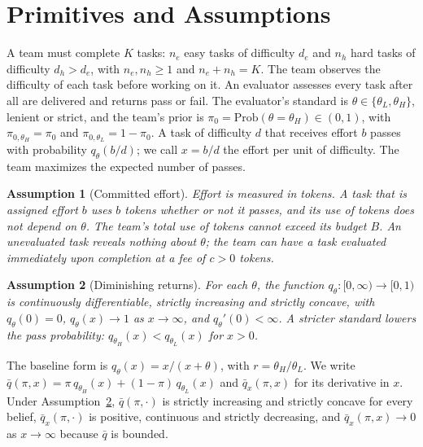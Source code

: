 \documentclass[11pt]{article}
\newtheorem{assumption}{Assumption}
\theoremstyle{definition}
\begin{document}
\section{Primitives and Assumptions}

A team must complete $K$ tasks: $n_e$ easy tasks of difficulty $d_e$ and $n_h$ hard tasks of difficulty $d_h>d_e$, with $n_e,n_h\ge1$ and $n_e+n_h=K$. The team observes the difficulty of each task before working on it. An evaluator assesses every task after all are delivered and returns pass or fail. The evaluator's standard is $\theta\in\{\theta_L,\theta_H\}$, lenient or strict, and the team's prior is $\pi_0=\mathrm{Prob}(\theta=\theta_H)\in(0,1)$, with $\pi_{0,\theta_H}=\pi_0$ and $\pi_{0,\theta_L}=1-\pi_0$. A task of difficulty $d$ that receives effort $b$ passes with probability $q_\theta(b/d)$; we call $x=b/d$ the effort per unit of difficulty. The team maximizes the expected number of passes.

\begin{assumption}[Committed effort]\label{as:cost}
Effort is measured in tokens. A task that is assigned effort $b$ uses $b$ tokens whether or not it passes, and its use of tokens does not depend on $\theta$. The team's total use of tokens cannot exceed its budget $B$. An unevaluated task reveals nothing about $\theta$; the team can have a task evaluated immediately upon completion at a fee of $c>0$ tokens.
\end{assumption}

\begin{assumption}[Diminishing returns]\label{as:returns}
For each $\theta$, the function $q_\theta:[0,\infty)\to[0,1)$ is continuously differentiable, strictly increasing and strictly concave, with $q_\theta(0)=0$, $q_\theta(x)\to1$ as $x\to\infty$, and $q_\theta'(0)<\infty$. A stricter standard lowers the pass probability: $q_{\theta_H}(x)<q_{\theta_L}(x)$ for $x>0$.
\end{assumption}

The baseline form is $q_\theta(x)=x/(x+\theta)$, with $r=\theta_H/\theta_L$. We write $\bar q(\pi,x)=\pi\,q_{\theta_H}(x)+(1-\pi)\,q_{\theta_L}(x)$ and $\bar q_x(\pi,x)$ for its derivative in $x$. Under Assumption~\ref{as:returns}, $\bar q(\pi,\cdot)$ is strictly increasing and strictly concave for every belief, $\bar q_x(\pi,\cdot)$ is positive, continuous and strictly decreasing, and $\bar q_x(\pi,x)\to0$ as $x\to\infty$ because $\bar q$ is bounded.
\end{document}
